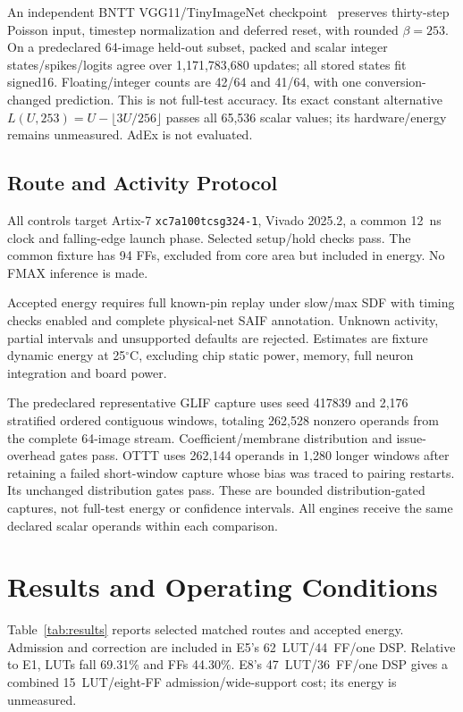 \documentclass[conference]{IEEEtran}
\begin{document}
An independent BNTT VGG11/TinyImageNet checkpoint~\cite{bntt} preserves thirty-step Poisson input, timestep normalization and deferred reset, with rounded $\beta=253$. On a predeclared 64-image held-out subset, packed and scalar integer states/spikes/logits agree over 1,171,783,680 updates; all stored states fit signed16. Floating/integer counts are 42/64 and 41/64, with one conversion-changed prediction. This is not full-test accuracy. Its exact constant alternative $L(U, 253)=U-\lfloor3U/256\rfloor$ passes all 65,536 scalar values; its hardware/energy remains unmeasured. AdEx is not evaluated.

\subsection{Route and Activity Protocol}
All controls target Artix-7 \texttt{xc7a100tcsg324-1}, Vivado 2025.2, a common 12~ns clock and falling-edge launch phase. Selected setup/hold checks pass. The common fixture has 94 FFs, excluded from core area but included in energy. No FMAX inference is made.

Accepted energy requires full known-pin replay under slow/max SDF with timing checks enabled and complete physical-net SAIF annotation. Unknown activity, partial intervals and unsupported defaults are rejected. Estimates are fixture dynamic energy at 25$^\circ$C, excluding chip static power, memory, full neuron integration and board power.

The predeclared representative GLIF capture uses seed 417839 and 2,176 stratified ordered contiguous windows, totaling 262,528 nonzero operands from the complete 64-image stream. Coefficient/membrane distribution and issue-overhead gates pass. OTTT uses 262,144 operands in 1,280 longer windows after retaining a failed short-window capture whose bias was traced to pairing restarts. Its unchanged distribution gates pass. These are bounded distribution-gated captures, not full-test energy or confidence intervals. All engines receive the same declared scalar operands within each comparison.

\section{Results and Operating Conditions}
Table~\ref{tab:results} reports selected matched routes and accepted energy. Admission and correction are included in E5's 62~LUT/44~FF/one DSP. Relative to E1, LUTs fall 69.31\% and FFs 44.30\%. E8's 47~LUT/36~FF/one DSP gives a combined 15~LUT/eight-FF admission/wide-support cost; its energy is unmeasured.
\end{document}
